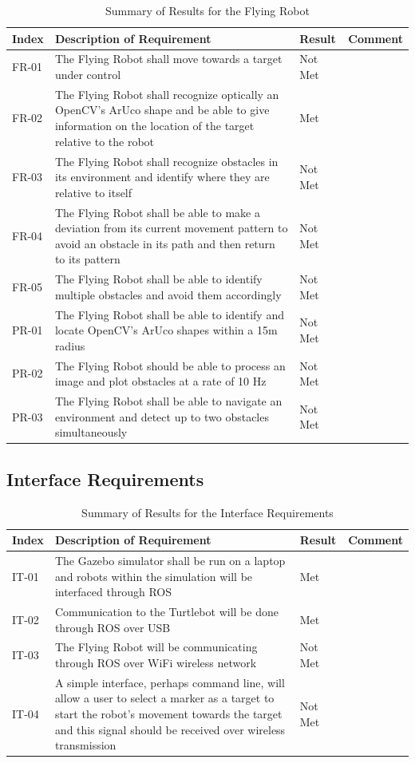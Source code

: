\documentclass{article}
\begin{document}
	\begin{table}
	    \small
		\begin{tabular}{p{2cm} p{8cm} p{2cm} p{3cm}}
			\hline
			{\textbf{Index}} & {\textbf{Description of Requirement}} & {\textbf{Result}} & {\textbf{Comment}} \\ \hline
FR-01 & The Flying Robot shall move towards a target under control & Not Met \\
FR-02 & The Flying Robot shall recognize optically an OpenCV's ArUco shape and be able to give information on the location of the target relative to the robot & Met \\
FR-03 & The Flying Robot shall recognize obstacles in its environment and identify where they are relative to itself & Not Met \\
FR-04 & The Flying Robot shall be able to make a deviation from its current movement pattern to avoid an obstacle in its path and then return to its pattern & Not Met  \\
FR-05 & The Flying Robot shall be able to identify multiple obstacles and avoid them accordingly & Not Met \\
PR-01 & The Flying Robot shall be able to identify and locate OpenCV's ArUco shapes within a 15m radius & Not Met \\
PR-02 & The Flying Robot should be able to process an image and plot obstacles at a rate of 10 Hz & Not Met \\
PR-03 & The Flying Robot shall be able to navigate an environment and detect up to two obstacles simultaneously & Not Met \\ \hline
		\end{tabular}
		\caption{Summary of Results for the Flying Robot}
		\label{table:uavresults}
    \end{table}

    \subsection{Interface Requirements}

	\begin{table}
	    \small
		\begin{tabular}{p{2cm} p{8cm} p{2cm} p{3cm}}
			\hline
			{\textbf{Index}} & {\textbf{Description of Requirement}} & {\textbf{Result}} & {\textbf{Comment}} \\ \hline
IT-01 & The Gazebo simulator shall be run on a laptop and robots within the simulation will be interfaced through ROS & Met \\
IT-02 & Communication to the Turtlebot will be done through ROS over USB & Met \\
IT-03 & The Flying Robot will be communicating through ROS over WiFi wireless network & Not Met \\
IT-04 & A simple interface, perhaps command line, will allow a user to select a marker as a target to start the robot's movement towards the target and this signal should be received over wireless transmission & Not Met \\ \hline
		\end{tabular}
		\caption{Summary of Results for the Interface Requirements}
		\label{table:interresults}
    \end{table}
    
\end{document}
